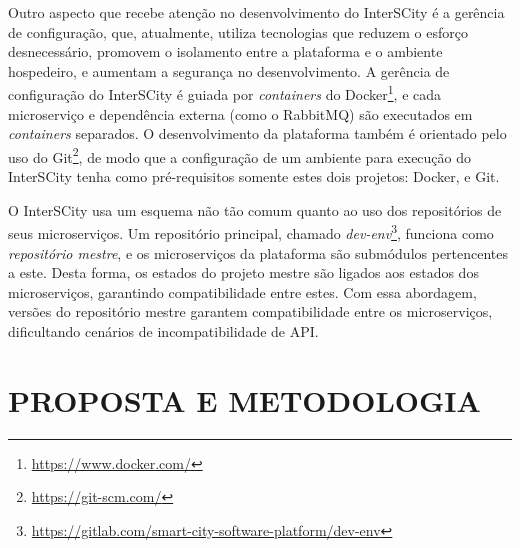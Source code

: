 Outro aspecto que recebe atenção no desenvolvimento do InterSCity é a gerência
de configuração, que, atualmente, utiliza tecnologias que reduzem o esforço
desnecessário, promovem o isolamento entre a plataforma e o ambiente hospedeiro,
e aumentam a segurança no desenvolvimento. A gerência de configuração do
InterSCity é guiada por \textit{containers} do
Docker\footnote{\url{https://www.docker.com/}}, e cada microserviço e
dependência externa (como o RabbitMQ) são executados em
\textit{containers} separados. O desenvolvimento da plataforma também é
orientado pelo uso do Git\footnote{\url{https://git-scm.com/}}, de modo que a
configuração de um ambiente para execução do InterSCity tenha como
pré-requisitos somente estes dois projetos: Docker, e Git.

O InterSCity usa um esquema não tão comum quanto ao uso dos repositórios de
seus microserviços. Um repositório principal, chamado
\textit{dev-env}\footnote{\url{https://gitlab.com/smart-city-software-platform/dev-env}},
funciona como \textit{repositório mestre}, e os microserviços da plataforma são
submódulos pertencentes a este. Desta forma, os estados do projeto mestre são
ligados aos estados dos microserviços, garantindo compatibilidade entre estes.
Com essa abordagem, versões do repositório mestre garantem compatibilidade
entre os microserviços, dificultando cenários de incompatibilidade de API.

\section{PROPOSTA E METODOLOGIA}
